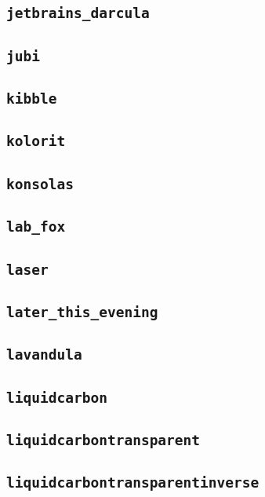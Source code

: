 \subsection{\texttt{jetbrains\_darcula}}
\newpage
\subsection{\texttt{jubi}}
\newpage
\subsection{\texttt{kibble}}
\newpage
\subsection{\texttt{kolorit}}
\newpage
\subsection{\texttt{konsolas}}
\newpage
\subsection{\texttt{lab\_fox}}
\newpage
\subsection{\texttt{laser}}
\newpage
\subsection{\texttt{later\_this\_evening}}
\newpage
\subsection{\texttt{lavandula}}
\newpage
\subsection{\texttt{liquidcarbon}}
\newpage
\subsection{\texttt{liquidcarbontransparent}}
\newpage
\subsection{\texttt{liquidcarbontransparentinverse}}
\newpage
